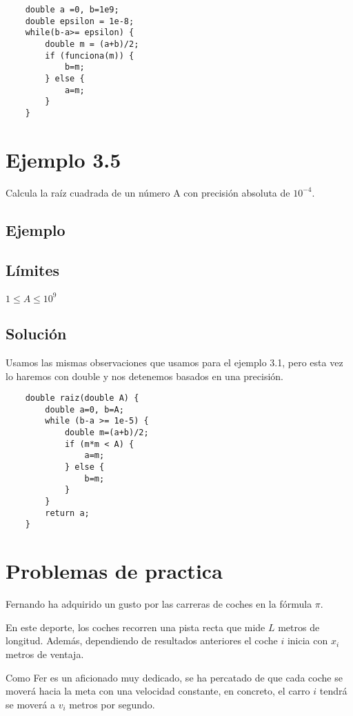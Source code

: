 \begin{lstlisting}
	double a =0, b=1e9;
	double epsilon = 1e-8;
	while(b-a>= epsilon) {
		double m = (a+b)/2;
		if (funciona(m)) {
			b=m;
		} else {
			a=m;
		}
	}
\end{lstlisting}

\section*{Ejemplo 3.5}
Calcula la raíz cuadrada de un número A con precisión absoluta de \(10^{-4}\).
\subsection*{Ejemplo}
\begin{casebox2}
\end{casebox2}
\subsection*{Límites}
\begin{plimits}
	\item \(1\leq A \leq 10^9\)
\end{plimits}
\subsection*{Solución}
Usamos las mismas observaciones que usamos para el ejemplo 3.1, pero esta vez lo haremos con double y nos detenemos basados en una precisión.
\begin{lstlisting}
	double raiz(double A) {
		double a=0, b=A;
		while (b-a >= 1e-5) {
			double m=(a+b)/2;
			if (m*m < A) {
				a=m;
			} else {
				b=m;
			}
		}
		return a;
	}
\end{lstlisting}

\newpage
\section*{Problemas de practica}
\problemtitle Fernando ha adquirido un gusto por las carreras de coches en la fórmula \(\pi\).

En este deporte, los coches recorren una pista recta que mide \(L\) metros de longitud. Además, dependiendo de resultados anteriores el coche \(i\) inicia con \(x_i\) metros de ventaja.

Como Fer es un aficionado muy dedicado, se ha percatado de que cada coche se moverá hacia la meta con una velocidad constante, en concreto, el carro \(i\) tendrá se moverá a \(v_i\) metros por segundo.

